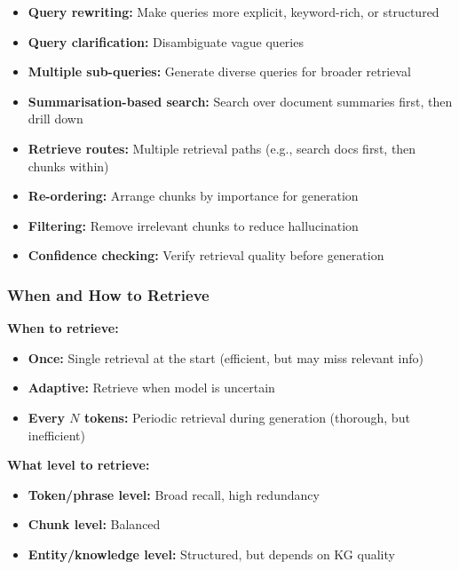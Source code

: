 \begin{thmbox}
\begin{itemize}
  \item \textbf{Query rewriting:} Make queries more explicit, keyword-rich, or structured
  \item \textbf{Query clarification:} Disambiguate vague queries
  \item \textbf{Multiple sub-queries:} Generate diverse queries for broader retrieval
  \item \textbf{Summarisation-based search:} Search over document summaries first, then drill down
  \item \textbf{Retrieve routes:} Multiple retrieval paths (e.g., search docs first, then chunks within)
\end{itemize}
\end{thmbox}

\begin{thmbox}
\begin{itemize}
  \item \textbf{Re-ordering:} Arrange chunks by importance for generation
  \item \textbf{Filtering:} Remove irrelevant chunks to reduce hallucination
  \item \textbf{Confidence checking:} Verify retrieval quality before generation
\end{itemize}
\end{thmbox}

\bigseparator

\subsubsection{When and How to Retrieve}

\begin{defbox}
\textbf{When to retrieve:}
\begin{itemize}
  \item \textbf{Once:} Single retrieval at the start (efficient, but may miss relevant info)
  \item \textbf{Adaptive:} Retrieve when model is uncertain
  \item \textbf{Every $N$ tokens:} Periodic retrieval during generation (thorough, but inefficient)
\end{itemize}

\textbf{What level to retrieve:}
\begin{itemize}
  \item \textbf{Token/phrase level:} Broad recall, high redundancy
  \item \textbf{Chunk level:} Balanced
  \item \textbf{Entity/knowledge level:} Structured, but depends on KG quality
\end{itemize}
\end{defbox}

